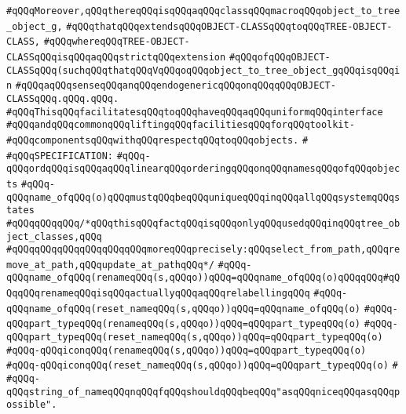 \verb|#qQQqMoreover,qQQqthereqQQqisqQQqaqQQqclassqQQqmacroqQQqobject_to_tree_object_g,|\newline
\verb|#qQQqthatqQQqextendsqQQqOBJECT-CLASSqQQqtoqQQqTREE-OBJECT-CLASS,|\newline
\verb|#qQQqwhereqQQqTREE-OBJECT-CLASSqQQqisqQQqaqQQqstrictqQQqextension|\newline
\verb|#qQQqofqQQqOBJECT-CLASSqQQq(suchqQQqthatqQQqVqQQqoqQQqobject_to_tree_object_gqQQqisqQQqin|\newline
\verb|#qQQqaqQQqsenseqQQqanqQQqendogenericqQQqonqQQqqQQqOBJECT-CLASSqQQq.qQQq.qQQq.|\newline
\verb|#qQQqThisqQQqfacilitatesqQQqtoqQQqhaveqQQqaqQQquniformqQQqinterface|\newline
\verb|#qQQqandqQQqcommonqQQqliftingqQQqfacilitiesqQQqforqQQqtoolkit-|\newline
\verb|#qQQqcomponentsqQQqwithqQQqrespectqQQqtoqQQqobjects.|\newline
\verb|#|\newline
\verb|#qQQqSPECIFICATION:|\newline
\verb|#qQQq-qQQqordqQQqisqQQqaqQQqlinearqQQqorderingqQQqonqQQqnamesqQQqofqQQqobjects|\newline
\verb|#qQQq-qQQqname_ofqQQq(o)qQQqmustqQQqbeqQQquniqueqQQqinqQQqallqQQqsystemqQQqstates|\newline
\verb|#qQQqqQQqqQQq/*qQQqthisqQQqfactqQQqisqQQqonlyqQQqusedqQQqinqQQqtree_object_classes,qQQq|\newline
\verb|#qQQqqQQqqQQqqQQqqQQqqQQqmoreqQQqprecisely:qQQqselect_from_path,qQQqremove_at_path,qQQqupdate_at_pathqQQq*/|\newline
\verb|#qQQq-qQQqname_ofqQQq(renameqQQq(s,qQQqo))qQQq=qQQqname_ofqQQq(o)qQQqqQQq#qQQqqQQqrenameqQQqisqQQqactuallyqQQqaqQQqrelabellingqQQq|\newline
\verb|#qQQq-qQQqname_ofqQQq(reset_nameqQQq(s,qQQqo))qQQq=qQQqname_ofqQQq(o)|\newline
\verb|#qQQq-qQQqpart_typeqQQq(renameqQQq(s,qQQqo))qQQq=qQQqpart_typeqQQq(o)|\newline
\verb|#qQQq-qQQqpart_typeqQQq(reset_nameqQQq(s,qQQqo))qQQq=qQQqpart_typeqQQq(o)|\newline
\verb|#qQQq-qQQqiconqQQq(renameqQQq(s,qQQqo))qQQq=qQQqpart_typeqQQq(o)|\newline
\verb|#qQQq-qQQqiconqQQq(reset_nameqQQq(s,qQQqo))qQQq=qQQqpart_typeqQQq(o)|\newline
\verb|#|\newline
\verb|#qQQq-qQQqstring_of_nameqQQqnqQQqfqQQqshouldqQQqbeqQQq"asqQQqniceqQQqasqQQqpossible".|\newline

